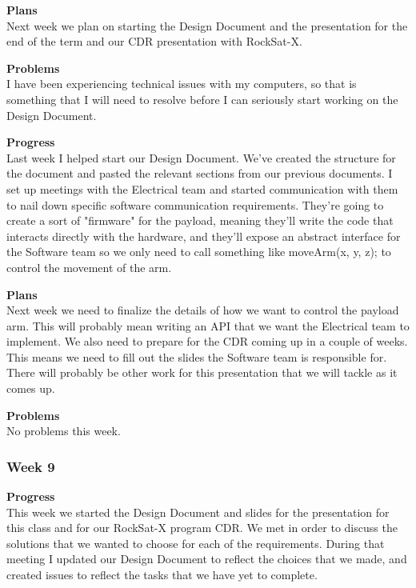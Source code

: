 \textbf{Plans} \\
Next week we plan on starting the Design Document and the presentation for the end of the term and our CDR presentation with RockSat-X.

\textbf{Problems} \\
I have been experiencing technical issues with my computers, so that is something that I will need to resolve before I can seriously start working on the Design Document.

\textbf{Progress} \\
Last week I helped start our Design Document. We've created the structure for the document and pasted the relevant sections from our previous documents. I set up meetings with the Electrical team and started communication with them to nail down specific software communication requirements. They're going to create a sort of "firmware" for the \gls{payload}, meaning they'll write the code that interacts directly with the hardware, and they'll expose an abstract interface for the Software team so we only need to call something like moveArm(x, y, z); to control the movement of the arm.

\textbf{Plans} \\
Next week we need to finalize the details of how we want to control the \gls{payload} arm. This will probably mean writing an API that we want the Electrical team to implement. We also need to prepare for the CDR coming up in a couple of weeks. This means we need to fill out the slides the Software team is responsible for. There will probably be other work for this presentation that we will tackle as it comes up.

\textbf{Problems} \\
No problems this week.

\subsubsection{Week 9}
\textbf{Progress} \\ 
This week we started the Design Document and slides for the presentation for this class and for our RockSat-X program CDR. We met in order to discuss the solutions that we wanted to choose for each of the requirements. During that meeting I updated our Design Document to reflect the choices that we made, and created issues to reflect the tasks that we have yet to complete.

